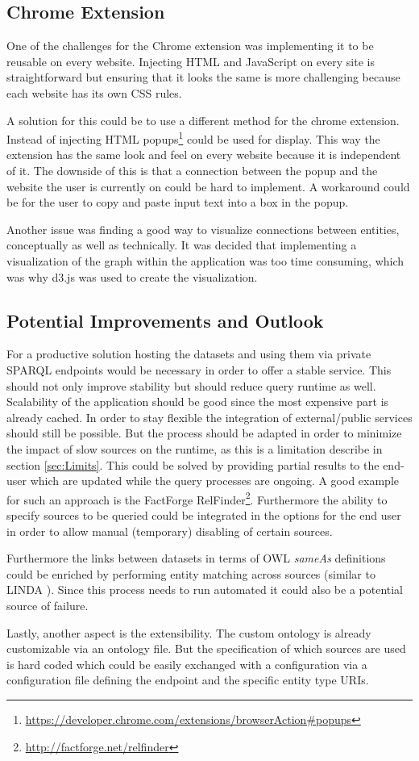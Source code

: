 \subsection{Chrome Extension}
One of the challenges for the Chrome extension was implementing it to be reusable on every website. Injecting HTML and JavaScript on every site is straightforward but ensuring that it looks the same is more challenging because each website has its own CSS rules.

A solution for this could be to use a different method for the chrome extension. Instead of injecting HTML popups\footnote{\url{https://developer.chrome.com/extensions/browserAction\#popups}} could be used for display. This way the extension has the same look and feel on every website because it is independent of it. The downside of this is that a connection between the popup and the website the user is currently on could be hard to implement. A workaround could be for the user to copy and paste input text into a box in the popup. 

Another issue was finding a good way to visualize connections between entities, conceptually as well as technically. It was decided that implementing a visualization of the graph within the application was too time consuming, which was why d3.js was used to create the visualization.




\subsection{Potential Improvements and Outlook}
For a productive solution hosting the datasets and using them via private SPARQL endpoints would be necessary in order to offer a stable service. This should not only improve stability but should reduce query runtime as well. Scalability of the application should be good since the most expensive part is already cached. 
In order to stay flexible the integration of external/public services should still be possible. But the process should be adapted in order to minimize the impact of slow sources on the runtime, as this is a limitation describe in section \ref{sec:Limits}. This could be solved by providing partial results to the end-user which are updated while the query processes are ongoing. A good example for such an approach is the FactForge RelFinder\footnote{\url{http://factforge.net/relfinder}}. Furthermore the ability to specify sources to be queried could be integrated in the options for the end user in order to allow manual (temporary) disabling of certain sources. 

Furthermore the links between datasets in terms of OWL \textit{sameAs} definitions could be enriched by performing entity matching across sources (similar to LINDA \cite{boehm_linda:_2012}). Since this process needs to run automated it could also be a potential source of failure. 

Lastly, another aspect is the extensibility. The custom ontology is already customizable via an ontology file. But the specification of which sources are used is hard coded which could be easily exchanged with a configuration via a configuration file defining the endpoint and the specific entity type URIs. 



